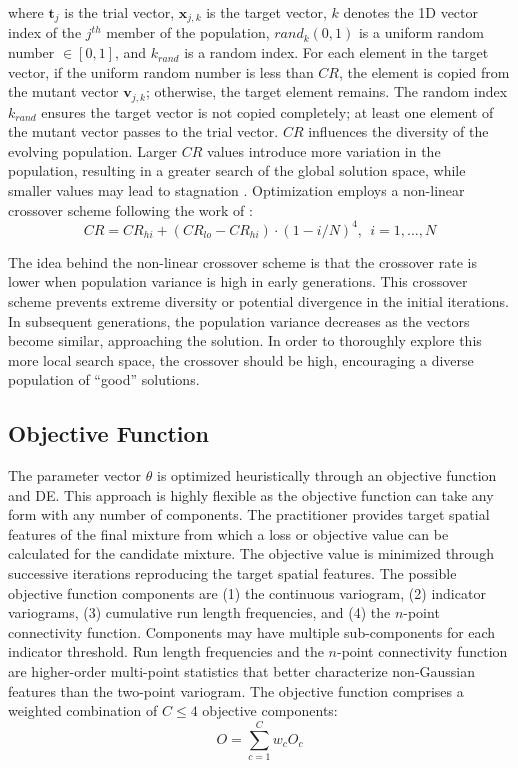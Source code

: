 \lowercase{Where} $\mathbf{t}_{j}$ is the trial vector, $\mathbf{x}_{j, k}$ is the target vector, $k$ denotes the \gls{1D} vector index of the $j^{th}$ member of the population, $rand_{k}(0,1)$ is a uniform random number $\in [0,1]$, and $k_{rand}$ is a random index. For each element in the target vector, if the uniform random number is less than $CR$, the element is copied from the mutant vector $\mathbf{v}_{j, k}$; otherwise, the target element remains. The random index $k_{rand}$ ensures the target vector is not copied completely; at least one element of the mutant vector passes to the trial vector. $CR$ influences the diversity of the evolving population. Larger $CR$ values introduce more variation in the population, resulting in a greater search of the global solution space, while smaller values may lead to stagnation \citep{georgioudakis2020comparative}. Optimization employs a non-linear crossover scheme following the work of \cite{mohamed2014rdel}:
\begin{equation}
    CR = CR_{hi} + (CR_{lo} - CR_{hi}) \cdot (1-i/N)^{4}, \ \ i=1,\dots, N
    \label{eq:f(cross)}
\end{equation}

The idea behind the non-linear crossover scheme is that the crossover rate is lower when population variance is high in early generations. This crossover scheme prevents extreme diversity or potential divergence in the initial iterations. In subsequent generations, the population variance decreases as the vectors become similar, approaching the solution. In order to thoroughly explore this more local search space, the crossover should be high, encouraging a diverse population of ``good'' solutions.

\subsection{Objective Function}
\label{subsec:04objfunc}

The parameter vector $\theta$ is optimized heuristically through an objective function and \gls{DE}. This approach is highly flexible as the objective function can take any form with any number of components. The practitioner provides target spatial features of the final mixture from which a loss or objective value can be calculated for the candidate mixture. The objective value is minimized through successive iterations reproducing the target spatial features. The possible objective function components are (1) the continuous variogram, (2) indicator variograms, (3) cumulative run length frequencies, and (4) the $n$-point connectivity function. Components may have multiple sub-components for each indicator threshold. Run length frequencies and the $n$-point connectivity function are higher-order multi-point statistics that better characterize non-Gaussian features than the two-point variogram. The objective function comprises a weighted combination of $C \leq 4$ objective components:
\begin{equation}
    O = \sum_{c=1}^{C} w_{c}O_{c}
    \label{eq:fobj}
\end{equation}

